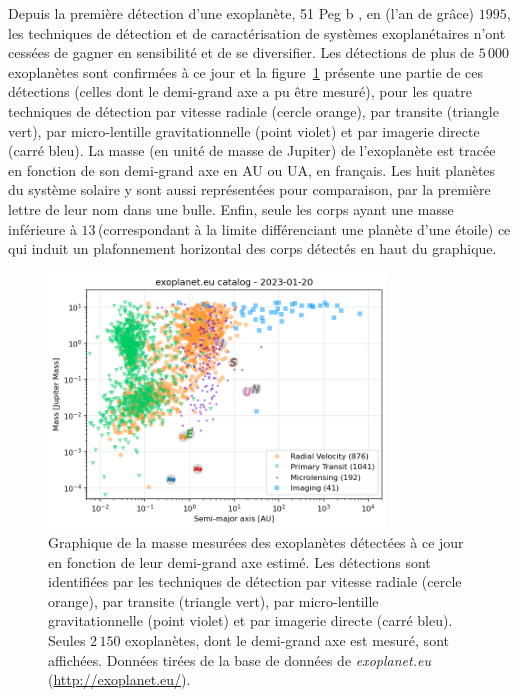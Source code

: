 Depuis la première détection d'une exoplanète, 51 Peg b \citep{mayor1995}, en (l'an de grâce) $1995$, les techniques de détection et de caractérisation de systèmes exoplanétaires n'ont cessées de gagner en sensibilité et de se diversifier. Les détections de plus de $5\,000$ exoplanètes sont confirmées à ce jour et la figure~\ref{fig:ExoplanetDetection} présente une partie de ces détections (celles dont le demi-grand axe a pu être mesuré), pour les quatre techniques de détection par vitesse radiale (cercle orange), par transite (triangle vert), par micro-lentille gravitationnelle (point violet) et par imagerie directe (carré bleu). La masse (en unité de masse de Jupiter) de l'exoplanète est tracée en fonction de son demi-grand axe en \ac{AU} ou \ac{UA}, en français. Les huit planètes du système solaire y sont aussi représentées pour comparaison, par la première lettre de leur nom dans une bulle. Enfin, seule les corps ayant une masse inférieure à $13 \,$\MJ (correspondant à la limite différenciant une planète d'une étoile) ce qui induit un plafonnement horizontal des corps détectés en haut du graphique.

\begin{figure}[ht!]
    \centering
    \includegraphics[width=0.8\textwidth]{Figure_Chap1/20230120_exoplanet_diagram_RV_PT_ML_IM.png}
    \caption[Graphique des exoplanètes détectées à ce jour suivant les quatre techniques de détection principales.]{Graphique de la masse mesurées des exoplanètes détectées à ce jour en fonction de leur demi-grand axe estimé. Les détections sont identifiées par les techniques de détection par vitesse radiale (cercle orange), par transite (triangle vert), par micro-lentille gravitationnelle (point violet) et par imagerie directe (carré bleu). Seules $2\,150$ exoplanètes, dont le demi-grand axe est mesuré, sont affichées. Données tirées de la base de données de \textit{exoplanet.eu} (\url{http://exoplanet.eu/}).}
    \label{fig:ExoplanetDetection}
\end{figure}

